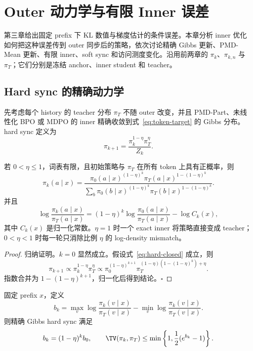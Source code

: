 \chapter{Outer 动力学与有限 Inner 误差}
\label{chap:outer-dynamics}

第三章给出固定 prefix 下 KL 数值与梯度估计的条件误差。本章分析 inner 优化如何把这种误差传到 outer 同步后的策略，依次讨论精确 Gibbs 更新、PMD-Mean 更新、有限 inner、soft sync 和访问测度变化。沿用前两章的 $\pi_k$、$\pi_{k,n}$ 与 $\pi_T$；它们分别是冻结 anchor、inner student 和 teacher。

\section{Hard sync 的精确动力学}

先考虑每个 history 的 teacher 分布 $\pi_T$ 不随 outer 改变，并且 PMD-Part、未线性化 BPO 或 MDPO 的 inner 精确收敛到式~\eqref{eq:token-target} 的 Gibbs 分布。hard sync 定义为
\[
 \pi_{k+1}=\frac{\pi_k^{1-\eta}\pi_T^\eta}{Z_k}.
\]

\begin{theorem}
\label{thm:hard-sync}
若 $0<\eta\leq1$，词表有限，且初始策略与 $\pi_T$ 在所有 token 上具有正概率，则
\begin{equation}\label{eq:hard-closed}
 \pi_k(a\mid x)=
 \frac{\pi_0(a\mid x)^{(1-\eta)^k}
 \pi_T(a\mid x)^{1-(1-\eta)^k}}
 {\sum_b\pi_0(b\mid x)^{(1-\eta)^k}\pi_T(b\mid x)^{1-(1-\eta)^k}}.
\end{equation}
并且
\[
 \log\frac{\pi_k(a\mid x)}{\pi_T(a\mid x)}
 =(1-\eta)^k\log\frac{\pi_0(a\mid x)}{\pi_T(a\mid x)}-\log C_k(x),
\]
其中 $C_k(x)$ 是归一化常数。$\eta=1$ 时一个 exact inner 将策略直接变成 teacher；$0<\eta<1$ 时每一轮只消除比例 $\eta$ 的 log-density mismatch。
\end{theorem}

\begin{proof}
归纳证明。$k=0$ 显然成立。假设式~\eqref{eq:hard-closed} 成立，则
\[
 \pi_{k+1}\propto\pi_k^{1-\eta}\pi_T^\eta
 \propto \pi_0^{(1-\eta)^{k+1}}
 \pi_T^{(1-\eta)(1-(1-\eta)^k)+\eta}.
\]
指数合并为 $1-(1-\eta)^{k+1}$，归一化后得到结论。\hfill$\square$
\end{proof}

\begin{corollary}[跨度收缩与分布距离]
固定 prefix $x$，定义
\[
 b_k=\max_v\log\frac{\pi_k(v\mid x)}{\pi_T(v\mid x)}
     -\min_v\log\frac{\pi_k(v\mid x)}{\pi_T(v\mid x)}.
\]
则精确 Gibbs hard sync 满足
\[
 b_k=(1-\eta)^k b_0,\qquad
 \TV(\pi_k,\pi_T)\leq\min\left\{1,\frac12(e^{b_k}-1)\right\}.
\]
\end{corollary}

